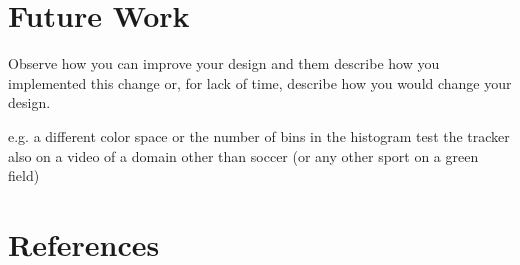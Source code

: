\documentclass[a4paper,11pt]{article}
\begin{document}
\section{Future Work} \label{sec:fut}
Observe how you can improve your design and them describe how you implemented this change or, for lack of time, describe how you would change your design. 

e.g. a different color space or the number of bins in the histogram
test the tracker also on a video of a domain other than soccer (or any other sport on a green field)

\section{References} 


% 
% 
\end{document}
